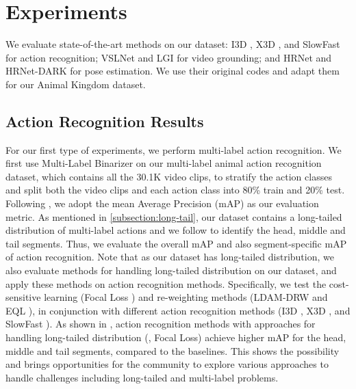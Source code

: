 \documentclass[10pt,twocolumn,letterpaper]{article}
\begin{document}
    
    
    
    \section{Experiments}
    We evaluate state-of-the-art methods on our dataset: I3D \cite{carreira2017quo}, X3D \cite{feichtenhofer2020x3d}, and SlowFast \cite{feichtenhofer2019slowfast} for action recognition; VSLNet \cite{zhang2020span} and LGI \cite{mun2020LGI} for video grounding; and HRNet \cite{SunXLW19} and HRNet-DARK\cite{Zhang_2020_CVPR} for pose estimation. We use their original codes and adapt them for our Animal Kingdom dataset.
    
    \subsection{Action Recognition Results}
    
    For our first type of experiments, we perform multi-label action recognition. We first use Multi-Label Binarizer \cite{scikit-learn} on our multi-label animal action recognition dataset, which contains all the 30.1K video clips, to stratify the action classes and split both the video clips and each action class into 80\% train and 20\% test. Following \cite{sigurdsson2016hollywood}, we adopt the mean Average Precision (mAP) as our evaluation metric. 
    As mentioned in \cref{subsection:long-tail}, our dataset contains a long-tailed distribution of multi-label actions and we follow \cite{zhang2021videolt} to identify the head, middle and tail segments. Thus, we evaluate the overall mAP and also segment-specific mAP of action recognition. Note that as our dataset has long-tailed distribution, we also evaluate methods for handling long-tailed distribution \cite{lin2017focal, cao2019learning, tan2020equalization} on our dataset, and apply these methods on action recognition methods. Specifically, we test the cost-sensitive learning  (Focal Loss \cite{lin2017focal}) and re-weighting methods (LDAM-DRW \cite{cao2019learning} and EQL \cite{tan2020equalization}), in conjunction with different action recognition methods (I3D \cite{carreira2017quo}, X3D \cite{feichtenhofer2020x3d}, and SlowFast \cite{feichtenhofer2019slowfast}). As shown in , action recognition methods with approaches for handling long-tailed distribution (\eg, Focal Loss) achieve higher mAP for the head, middle and tail segments, compared to the baselines. This shows the possibility and brings opportunities for the community to explore various approaches to handle challenges including long-tailed and multi-label problems.
    
\end{document}
